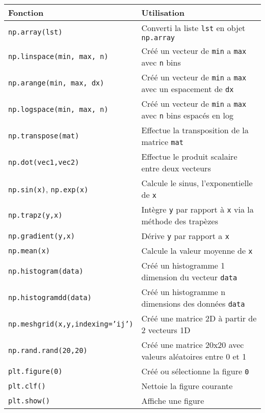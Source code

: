 \documentclass{article}
\begin{document}
\begin{tabular}{|l|l|}
    \hline
    Fonction                                    & Utilisation\\
    \hline
    \texttt{np.array(lst)}                      & Converti la liste \texttt{lst} en objet \texttt{np.array}\\
    \texttt{np.linspace(min, max, n)}           & Créé un vecteur de \texttt{min} a \texttt{max} avec \texttt{n} bins\\
    \texttt{np.arange(min, max, dx)}            & Créé un vecteur de \texttt{min} a \texttt{max} avec un espacement de \texttt{dx}\\
    \texttt{np.logspace(min, max, n)}           & Créé un vecteur de \texttt{min} a \texttt{max} avec \texttt{n} bins espacés en log\\
    \texttt{np.transpose(mat)}                  & Effectue la transposition de la matrice \texttt{mat}\\
    \texttt{np.dot(vec1,vec2)}                  & Effectue le produit scalaire entre deux vecteurs\\
    \texttt{np.sin(x)}, \texttt{np.exp(x)}      & Calcule le sinus, l'exponentielle de \texttt{x}\\
    \texttt{np.trapz(y,x)}                      & Intègre \texttt{y} par rapport à \texttt{x} via la méthode des trapèzes\\
    \texttt{np.gradient(y,x)}                   & Dérive \texttt{y} par rapport a \texttt{x}\\
    \texttt{np.mean(x)}                         & Calcule la valeur moyenne de \texttt{x}\\
    \texttt{np.histogram(data)}                 & Créé un histogramme 1 dimension du vecteur \texttt{data}\\
    \texttt{np.histogramdd(data)}               & Créé un histogramme n dimensions des données \texttt{data}\\
    \texttt{np.meshgrid(x,y,indexing='ij')}     & Créé une matrice 2D à partir de 2 vecteurs 1D\\
    \texttt{np.rand.rand(20,20)}                & Créé une matrice 20x20 avec valeurs aléatoires entre 0 et 1\\
    \texttt{plt.figure(0)}                      & Créé ou sélectionne la figure \texttt{0}\\
    \texttt{plt.clf()}                          & Nettoie la figure courante\\
    \texttt{plt.show()}                         & Affiche une figure\\

\end{tabular}
\end{document}
